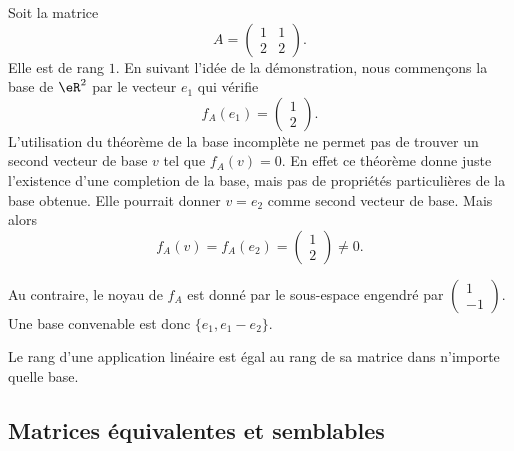 \begin{example}     \label{EXooRKVQooZOGDEf}
    Soit la matrice 
    \begin{equation}
        A=\begin{pmatrix}
            1    &   1    \\ 
            2    &   2    
        \end{pmatrix}.
    \end{equation}
    Elle est de rang \( 1\). En suivant l'idée de la démonstration, nous commençons la base de \( \eR^2\) par le vecteur \( e_1\) qui vérifie
    \begin{equation}
        f_A(e_1)=\begin{pmatrix}
            1    \\ 
            2    
        \end{pmatrix}.
    \end{equation}
    L'utilisation du théorème de la base incomplète ne permet pas de trouver un second vecteur de base \( v\) tel que \( f_A(v)=0\). En effet ce théorème donne juste l'existence d'une completion de la base, mais pas de propriétés particulières de la base obtenue. Elle pourrait donner \( v=e_2\) comme second vecteur de base. Mais alors
    \begin{equation}
        f_A(v)=f_A(e_2)=\begin{pmatrix}
            1    \\ 
            2    
        \end{pmatrix}\neq 0.
    \end{equation}

    Au contraire, le noyau de \( f_A\) est donné par le sous-espace engendré par \( \begin{pmatrix}
        1    \\ 
        -1    
    \end{pmatrix}\). Une base convenable est donc \( \{ e_1, e_1-e_2 \}\).
\end{example}

\begin{proposition}     \label{PROPooEGNBooIffJXc}
    Le rang d'une application linéaire est égal au rang de sa matrice dans n'importe quelle base.
\end{proposition}

\subsection{Matrices équivalentes et semblables}

